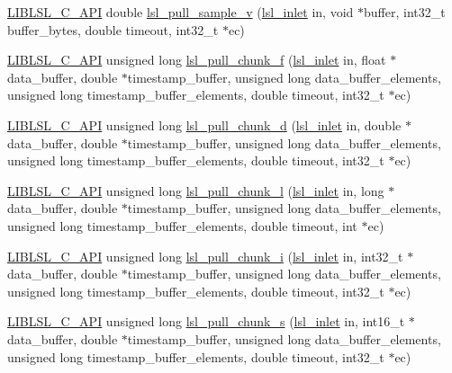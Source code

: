 \begin{DoxyCompactItemize}
\hyperlink{lsl__cpp_8h_aafd0ef1813e8be84a1420c4f1df64615}{L\+I\+B\+L\+S\+L\+\_\+\+C\+\_\+\+A\+PI} double \hyperlink{namespacelsl_a4b9141b42af68f2224c1f72044bf6018}{lsl\+\_\+pull\+\_\+sample\+\_\+v} (\hyperlink{namespacelsl_a884a3363cfcba75d7ce8f00c1c4c54f1}{lsl\+\_\+inlet} in, void $\ast$buffer, int32\+\_\+t buffer\+\_\+bytes, double timeout, int32\+\_\+t $\ast$ec)
\item 
\hyperlink{lsl__cpp_8h_aafd0ef1813e8be84a1420c4f1df64615}{L\+I\+B\+L\+S\+L\+\_\+\+C\+\_\+\+A\+PI} unsigned long \hyperlink{namespacelsl_a59b21970f29b294c8d4d43be06335cba}{lsl\+\_\+pull\+\_\+chunk\+\_\+f} (\hyperlink{namespacelsl_a884a3363cfcba75d7ce8f00c1c4c54f1}{lsl\+\_\+inlet} in, float $\ast$data\+\_\+buffer, double $\ast$timestamp\+\_\+buffer, unsigned long data\+\_\+buffer\+\_\+elements, unsigned long timestamp\+\_\+buffer\+\_\+elements, double timeout, int32\+\_\+t $\ast$ec)
\item 
\hyperlink{lsl__cpp_8h_aafd0ef1813e8be84a1420c4f1df64615}{L\+I\+B\+L\+S\+L\+\_\+\+C\+\_\+\+A\+PI} unsigned long \hyperlink{namespacelsl_ad8e4cbb24fb74cd532abf50fe3a8d571}{lsl\+\_\+pull\+\_\+chunk\+\_\+d} (\hyperlink{namespacelsl_a884a3363cfcba75d7ce8f00c1c4c54f1}{lsl\+\_\+inlet} in, double $\ast$data\+\_\+buffer, double $\ast$timestamp\+\_\+buffer, unsigned long data\+\_\+buffer\+\_\+elements, unsigned long timestamp\+\_\+buffer\+\_\+elements, double timeout, int32\+\_\+t $\ast$ec)
\item 
\hyperlink{lsl__cpp_8h_aafd0ef1813e8be84a1420c4f1df64615}{L\+I\+B\+L\+S\+L\+\_\+\+C\+\_\+\+A\+PI} unsigned long \hyperlink{namespacelsl_a1f78178ddd5cb824e36d4322677bbfe9}{lsl\+\_\+pull\+\_\+chunk\+\_\+l} (\hyperlink{namespacelsl_a884a3363cfcba75d7ce8f00c1c4c54f1}{lsl\+\_\+inlet} in, long $\ast$data\+\_\+buffer, double $\ast$timestamp\+\_\+buffer, unsigned long data\+\_\+buffer\+\_\+elements, unsigned long timestamp\+\_\+buffer\+\_\+elements, double timeout, int $\ast$ec)
\item 
\hyperlink{lsl__cpp_8h_aafd0ef1813e8be84a1420c4f1df64615}{L\+I\+B\+L\+S\+L\+\_\+\+C\+\_\+\+A\+PI} unsigned long \hyperlink{namespacelsl_a5f10ff6b4a4ff08c0e9f78d41c495c60}{lsl\+\_\+pull\+\_\+chunk\+\_\+i} (\hyperlink{namespacelsl_a884a3363cfcba75d7ce8f00c1c4c54f1}{lsl\+\_\+inlet} in, int32\+\_\+t $\ast$data\+\_\+buffer, double $\ast$timestamp\+\_\+buffer, unsigned long data\+\_\+buffer\+\_\+elements, unsigned long timestamp\+\_\+buffer\+\_\+elements, double timeout, int32\+\_\+t $\ast$ec)
\item 
\hyperlink{lsl__cpp_8h_aafd0ef1813e8be84a1420c4f1df64615}{L\+I\+B\+L\+S\+L\+\_\+\+C\+\_\+\+A\+PI} unsigned long \hyperlink{namespacelsl_a577a886ca87effb6b93a295466b9c933}{lsl\+\_\+pull\+\_\+chunk\+\_\+s} (\hyperlink{namespacelsl_a884a3363cfcba75d7ce8f00c1c4c54f1}{lsl\+\_\+inlet} in, int16\+\_\+t $\ast$data\+\_\+buffer, double $\ast$timestamp\+\_\+buffer, unsigned long data\+\_\+buffer\+\_\+elements, unsigned long timestamp\+\_\+buffer\+\_\+elements, double timeout, int32\+\_\+t $\ast$ec)

\end{DoxyCompactItemize}
